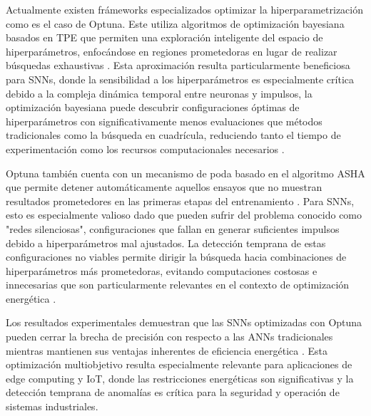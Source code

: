 Actualmente existen frámeworks especializados optimizar la hiperparametrización como es el caso de Optuna. Este utiliza algoritmos de optimización bayesiana basados en TPE que permiten una exploración inteligente del espacio de hiperparámetros, enfocándose en regiones prometedoras en lugar de realizar búsquedas exhaustivas \cite{noauthor_optuna_nodate}. Esta aproximación resulta particularmente beneficiosa para SNNs, donde la sensibilidad a los hiperparámetros es especialmente crítica debido a la compleja dinámica temporal entre neuronas y impulsos, la optimización bayesiana puede descubrir configuraciones óptimas de hiperparámetros con significativamente menos evaluaciones que métodos tradicionales como la búsqueda en cuadrícula, reduciendo tanto el tiempo de experimentación como los recursos computacionales necesarios \cite{firmin_parallel_2024}.

Optuna también cuenta con un mecanismo de poda  basado en el algoritmo ASHA que permite detener automáticamente aquellos ensayos que no muestran resultados prometedores en las primeras etapas del entrenamiento \cite{noauthor_efficient_2021}. Para SNNs, esto es especialmente valioso dado que pueden sufrir del problema conocido como "redes silenciosas", configuraciones que fallan en generar suficientes impulsos debido a hiperparámetros mal ajustados. La detección temprana de estas configuraciones no viables permite dirigir la búsqueda hacia combinaciones de hiperparámetros más prometedoras, evitando computaciones costosas e innecesarias que son particularmente relevantes en el contexto de optimización energética \cite{firmin_parallel_2024}. 

Los resultados experimentales demuestran que las SNNs optimizadas con Optuna pueden cerrar la brecha de precisión con respecto a las ANNs tradicionales mientras mantienen sus ventajas inherentes de eficiencia energética \cite{parsa_bayesian-based_2019}. Esta optimización multiobjetivo resulta especialmente relevante para aplicaciones de edge computing y IoT, donde las restricciones energéticas son significativas y la detección temprana de anomalías es crítica para la seguridad y operación de sistemas industriales.